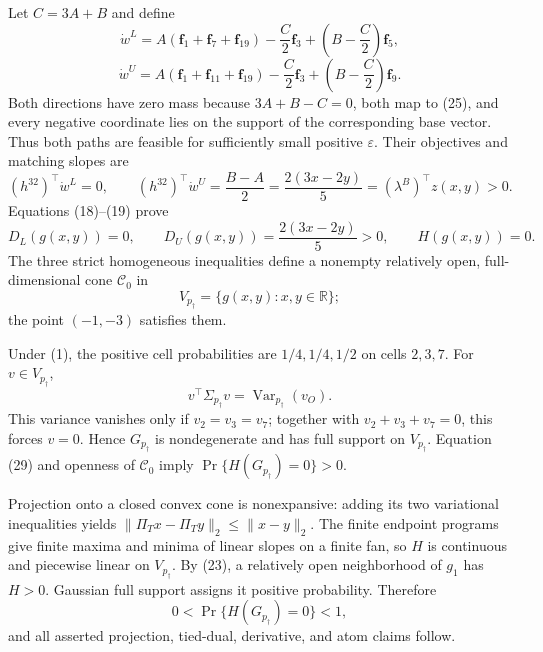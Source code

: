 Let \(C=3A+B\) and define
\[
\dot w^L=A(\mathbf f_1+\mathbf f_7+\mathbf f_{19})
-\frac C2\mathbf f_3+\left(B-\frac C2\right)\mathbf f_5,
\tag{27}
\]
\[
\dot w^U=A(\mathbf f_1+\mathbf f_{11}+\mathbf f_{19})
-\frac C2\mathbf f_3+\left(B-\frac C2\right)\mathbf f_9.
\tag{28}
\]
Both directions have zero mass because \(3A+B-C=0\), both map to (25), and every negative coordinate lies on the support of the corresponding base vector.  Thus both paths are feasible for sufficiently small positive \(\varepsilon\).  Their objectives and matching slopes are
\[
(h^{32})^{\top}\dot w^L=0,
\qquad
(h^{32})^{\top}\dot w^U=\frac{B-A}{2}
=\frac{2(3x-2y)}5
=(\lambda^B)^{\top}z(x,y)>0.
\]
Equations (18)--(19) prove
\[
D_L(g(x,y))=0,
\qquad
D_U(g(x,y))=\frac{2(3x-2y)}5>0,
\qquad
H(g(x,y))=0.
\tag{29}
\]
The three strict homogeneous inequalities define a nonempty relatively open, full-dimensional cone \(\mathcal C_0\) in
\[
V_{p_\dagger}=\{g(x,y):x,y\in\mathbb R\};
\]
the point \((-1,-3)\) satisfies them.

Under (1), the positive cell probabilities are \(1/4,1/4,1/2\) on cells \(2,3,7\).  For \(v\in V_{p_\dagger}\),
\[
v^{\top}\Sigma_{p_\dagger}v=\operatorname{Var}_{p_\dagger}(v_O).
\tag{30}
\]
This variance vanishes only if \(v_2=v_3=v_7\); together with \(v_2+v_3+v_7=0\), this forces \(v=0\).  Hence \(G_{p_\dagger}\) is nondegenerate and has full support on \(V_{p_\dagger}\).  Equation (29) and openness of \(\mathcal C_0\) imply \(\Pr\{H(G_{p_\dagger})=0\}>0\).

Projection onto a closed convex cone is nonexpansive: adding its two variational inequalities yields \(\|\Pi_Tx-\Pi_Ty\|_2\leq\|x-y\|_2\).  The finite endpoint programs give finite maxima and minima of linear slopes on a finite fan, so \(H\) is continuous and piecewise linear on \(V_{p_\dagger}\).  By (23), a relatively open neighborhood of \(g_1\) has \(H>0\).  Gaussian full support assigns it positive probability.  Therefore
\[
0<\Pr\{H(G_{p_\dagger})=0\}<1,
\]
and all asserted projection, tied-dual, derivative, and atom claims follow.